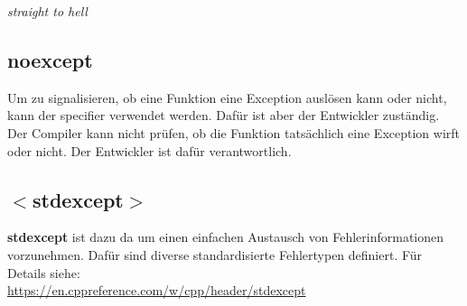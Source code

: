 \colorbox{red!50}{\textit{straight to hell}}

\subsection{noexcept}

Um zu signalisieren, ob eine Funktion eine Exception auslösen kann oder nicht, kann der specifier  verwendet werden. 
Dafür ist aber der Entwickler zuständig. 
Der Compiler kann nicht prüfen, ob die Funktion tatsächlich eine Exception wirft oder nicht. 
Der Entwickler ist dafür verantwortlich. 

\subsection{$<$stdexcept$>$}

\textbf{stdexcept} ist dazu da um einen einfachen Austausch von Fehlerinformationen vorzunehmen. 
Dafür sind diverse standardisierte Fehlertypen definiert. 
Für Details siehe:\\
\url{https://en.cppreference.com/w/cpp/header/stdexcept}

